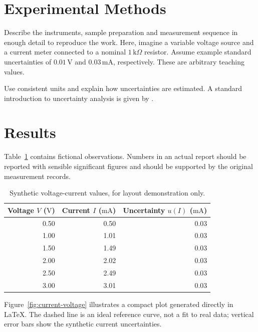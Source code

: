 \documentclass[11pt,a4paper]{article}
\begin{document}
\section{Experimental Methods}
\label{sec:methods}
Describe the instruments, sample preparation and measurement sequence in enough
detail to reproduce the work. Here, imagine a variable voltage source and a
current meter connected to a nominal \(1\,\mathrm{k}\Omega\) resistor.
Assume example standard uncertainties of \(0.01\,\mathrm{V}\) and
\(0.03\,\mathrm{mA}\), respectively. These are arbitrary teaching values.

Use consistent units and explain how uncertainties are estimated. A standard
introduction to uncertainty analysis is given by \citet{taylor1997}.

\section{Results}
\label{sec:results}
Table~\ref{tab:data} contains fictional observations. Numbers in an actual
report should be reported with sensible significant figures and should be
supported by the original measurement records.

\begin{table}[htbp]
    \centering
    \caption{Synthetic voltage-current values, for layout demonstration only.}
    \label{tab:data}
    \begin{tabular}{@{}rrr@{}}
        \toprule
        Voltage \(V\) (\(\mathrm{V}\)) &
        Current \(I\) (\(\mathrm{mA}\)) &
        Uncertainty \(u(I)\) (\(\mathrm{mA}\)) \\
        \midrule
        0.50 & 0.50 & 0.03 \\
        1.00 & 1.01 & 0.03 \\
        1.50 & 1.49 & 0.03 \\
        2.00 & 2.02 & 0.03 \\
        2.50 & 2.49 & 0.03 \\
        3.00 & 3.01 & 0.03 \\
        \bottomrule
    \end{tabular}
\end{table}

Figure~\ref{fig:current-voltage} illustrates a compact plot generated directly
in LaTeX. The dashed line is an ideal reference curve, not a fit to real data;
vertical error bars show the synthetic current uncertainties.
\end{document}
